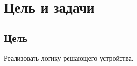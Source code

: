 \chapter*{Цель и задачи}
\label{ch:intro}

\section{Цель}
Реализовать логику решающего устройства.
\endinput